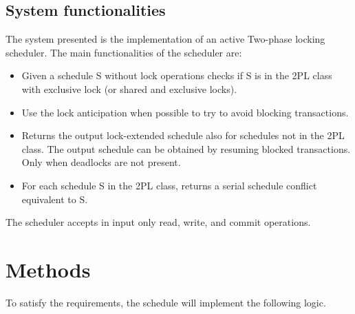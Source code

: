 \documentclass{article}
\begin{document}
\subsection{System functionalities}
The system presented is the implementation of an active Two-phase locking scheduler.
The main functionalities of the scheduler are:
\begin{itemize}
    \item Given a schedule S without lock operations checks if S is in the 2PL class with exclusive lock (or shared and exclusive locks).
    \item Use the lock anticipation when possible to try to avoid blocking transactions.
    \item Returns the output lock-extended schedule also for schedules not in the 2PL class. The output schedule can be obtained by resuming blocked transactions. Only when deadlocks are not present. 
    \item For each schedule S in the 2PL class, returns a serial schedule conflict equivalent to S.
\end{itemize}
The scheduler accepts in input only read, write, and commit operations.
\newpage
\section{Methods}
To satisfy the requirements, the schedule will implement the following logic.
\end{document}
